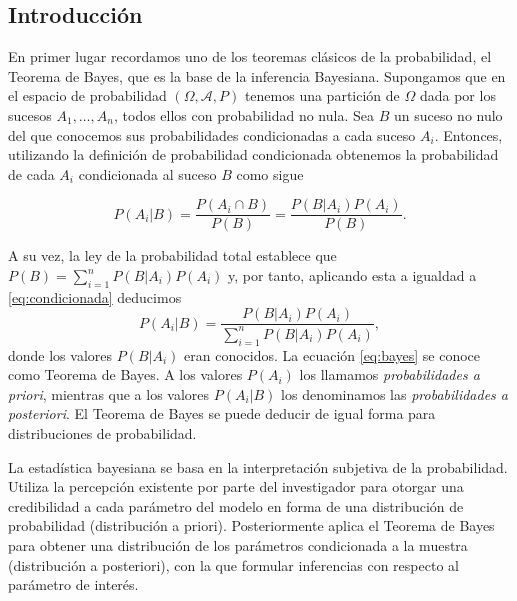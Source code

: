 \documentclass{article}
\begin{document}
\subsection{Introducción}

En primer lugar recordamos uno de los teoremas clásicos de la probabilidad, el Teorema de Bayes, que es la base de la inferencia Bayesiana. Supongamos que en el espacio de probabilidad $(\Omega,\mathcal{A},P)$ tenemos una partición de $\Omega$ dada por los sucesos $A_1,\dots,A_n$, todos ellos con probabilidad no nula. Sea $B$ un suceso no nulo del que conocemos sus probabilidades condicionadas a cada suceso $A_i$. Entonces, utilizando la definición de probabilidad condicionada obtenemos la probabilidad de cada $A_i$ condicionada al suceso $B$ como sigue

\begin{equation} \label{eq:condicionada}
	P(A_i|B)=\frac{P(A_i\cap B)}{P(B)}=\frac{P(B|A_i)P(A_i)}{P(B)}.
\end{equation}

A su vez, la ley de la probabilidad total establece que $P(B)=\sum_{i=1}^n{P(B|A_i)P(A_i)}$ y, por tanto, aplicando esta a igualdad a \eqref{eq:condicionada} deducimos
\begin{equation} \label{eq:bayes}
	P(A_i|B)=\frac{P(B|A_i)P(A_i)}{\sum_{i=1}^n{P(B|A_i)P(A_i)}},
\end{equation}
donde los valores $P(B|A_i)$ eran conocidos. La ecuación \eqref{eq:bayes} se conoce como Teorema de Bayes. A los valores $P(A_i)$ los llamamos \emph{probabilidades a priori}, mientras que a los valores $P(A_i|B)$ los denominamos las \emph{probabilidades a posteriori}. El Teorema de Bayes se puede deducir de igual forma para distribuciones de probabilidad.

La estadística bayesiana se basa en la interpretación subjetiva de la probabilidad. Utiliza la percepción existente por parte del investigador para otorgar una credibilidad a cada parámetro del modelo en forma de una distribución de probabilidad (distribución a priori). Posteriormente aplica el Teorema de Bayes para obtener una distribución de los parámetros condicionada a la muestra (distribución a posteriori), con la que formular inferencias con respecto al parámetro de interés.
\end{document}
